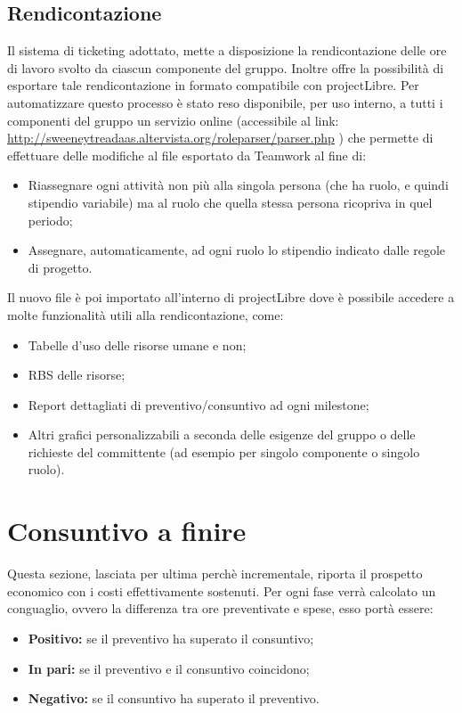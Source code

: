 \documentclass[a4paper]{report}
\newcommand{\mychapter}[2]{
	\setcounter{chapter}{#1}
	\setcounter{section}{0}
	\setcounter{subsection}{1}
	\chapter*{#2}
	\addcontentsline{toc}{chapter}{#2}
}
\begin{document}
		\section{Rendicontazione}
			Il sistema di ticketing adottato, mette a disposizione la rendicontazione delle ore di lavoro svolto da 
			ciascun componente del gruppo. Inoltre offre la possibilità di esportare tale rendicontazione in formato 
			compatibile con projectLibre. Per automatizzare questo processo è stato reso disponibile, per uso interno, 
			a tutti i componenti del gruppo un servizio online (accessibile al link:
			\url{http://sweeneytreadaas.altervista.org/roleparser/parser.php} ) che permette di effettuare delle modifiche al 
			file esportato da Teamwork al fine di:
			\begin{itemize}
				\item  Riassegnare ogni attività non più alla singola persona (che ha ruolo, e quindi stipendio variabile) 
				ma al ruolo che quella stessa persona ricopriva in quel periodo;
				\item Assegnare, automaticamente, ad ogni ruolo lo stipendio indicato dalle regole di progetto.
			\end{itemize}
			Il nuovo file è poi importato all'interno di projectLibre dove è possibile accedere a molte funzionalità utili 
			alla rendicontazione, come:
			\begin{itemize}
				\item Tabelle d'uso delle risorse umane e non;
				\item RBS delle risorse;
				\item Report dettagliati di preventivo/consuntivo ad ogni milestone;
				\item Altri grafici personalizzabili a seconda delle esigenze del gruppo o delle richieste del committente 
				(ad esempio per singolo componente o singolo ruolo).
			\end{itemize}


	\mychapter{7}{Consuntivo a finire}
		Questa sezione, lasciata per ultima perchè incrementale, riporta il prospetto economico con i 
		costi effettivamente sostenuti. Per ogni fase verrà calcolato un conguaglio, ovvero la differenza
		tra ore preventivate e spese, esso portà essere:
		\begin{itemize}
			\item \textbf{Positivo:} se il preventivo ha superato il consuntivo;
			\item \textbf{In pari:} se il preventivo e il consuntivo coincidono;
			\item \textbf{Negativo:} se il consuntivo ha superato il preventivo.
		\end{itemize}
\end{document}
